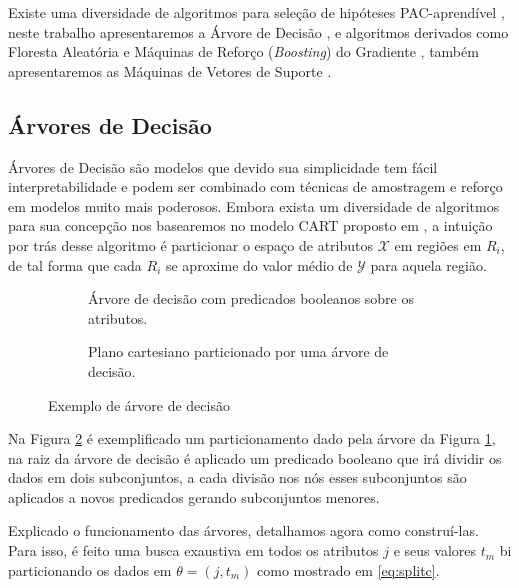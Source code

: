 Existe uma diversidade de algoritmos para seleção de hipóteses PAC-aprendível
\cite{mohri2018foundations}, neste trabalho apresentaremos a
Árvore de Decisão \cite{breiman1984classification}, e algoritmos derivados como Floresta Aleatória \cite{Ho1998,Breiman2001} e Máquinas de
Reforço (\textit{Boosting}) do Gradiente \cite{friedman2001greedy}, também apresentaremos as Máquinas de
Vetores de Suporte \cite{vapnik2013nature}.

\subsection{Árvores de Decisão}
Árvores de Decisão são modelos que devido sua simplicidade tem fácil
interpretabilidade e podem ser combinado com técnicas de amostragem e
reforço em modelos muito mais poderosos. Embora exista um diversidade de
algoritmos para sua concepção nos basearemos no modelo CART proposto em
\cite{breiman1984classification}, a intuição por trás desse algoritmo é
particionar o espaço de atributos $\mathcal{X}$ em regiões em $R_i$, de
tal forma que cada $R_i$ se aproxime do valor médio de $\mathcal{Y}$ para
aquela região.

\begin{figure}[ht]
   \centering
    \begin{subfigure}{.4\textwidth}
        \centering
        \def\svgwidth{1.4\linewidth}
        \caption{Árvore de decisão com predicados booleanos sobre os atributos.}
        \label{fig:tree}
    \end{subfigure}
     \hfill
    \begin{subfigure}{.4\textwidth}
        \centering
        \def\svgwidth{.8\linewidth}
        \caption{Plano cartesiano particionado por uma árvore de decisão.}
        \label{fig:split}
    \end{subfigure}
    \caption{Exemplo de árvore de decisão}
    \label{fig:three graphs}
\end{figure}


Na Figura \ref{fig:split} é exemplificado um particionamento dado pela árvore
da Figura \ref{fig:tree}, na raiz da árvore de decisão é aplicado um predicado
booleano que irá dividir os dados em dois subconjuntos, a cada divisão nos nós
esses subconjuntos são aplicados a novos predicados gerando subconjuntos
menores.

Explicado o funcionamento das árvores, detalhamos agora como construí-las. Para
isso, é feito uma busca exaustiva em todos os atributos $j$ e seus valores
$t_m$ bi particionando os dados em $\theta = (j,t_m)$ como mostrado em
\ref{eq:splitc}.

